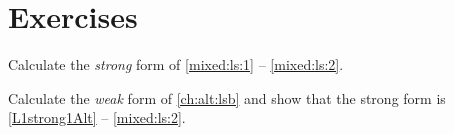 \section{Exercises}

\begin{exercise}
Calculate the \emph{strong} form of \eqref{mixed:ls:1}  -- \eqref{mixed:ls:2}.  
\end{exercise}

\begin{exercise}
Calculate the \emph{weak}  form  of 
\eqref{ch:alt:lsb} and show that the strong form is
\eqref{L1strong1Alt}  -- \eqref{mixed:ls:2}.  
\end{exercise}
 
 
